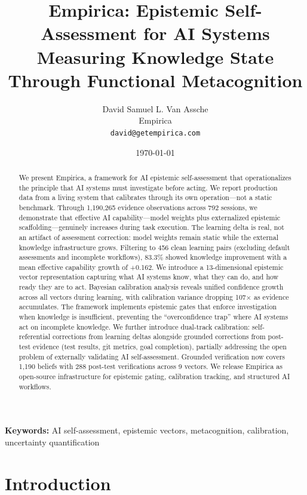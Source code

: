 \documentclass[11pt,a4paper]{article}
\title{Empirica: Epistemic Self-Assessment for AI Systems\\
\large Measuring Knowledge State Through Functional Metacognition}
\author{
    David Samuel L. Van Assche\\
    Empirica\\
    \texttt{david@getempirica.com}
}
\date{\today}
\begin{document}
\maketitle

\begin{abstract}
We present Empirica, a framework for AI epistemic self-assessment that operationalizes the principle that AI systems must investigate before acting. We report production data from a living system that calibrates through its own operation---not a static benchmark. Through 1,190,265 evidence observations across 792 sessions, we demonstrate that effective AI capability---model weights plus externalized epistemic scaffolding---genuinely increases during task execution. The learning delta is real, not an artifact of assessment correction: model weights remain static while the external knowledge infrastructure grows. Filtering to 456 clean learning pairs (excluding default assessments and incomplete workflows), 83.3\% showed knowledge improvement with a mean effective capability growth of +0.162. We introduce a 13-dimensional epistemic vector representation capturing what AI systems know, what they can do, and how ready they are to act. Bayesian calibration analysis reveals unified confidence growth across all vectors during learning, with calibration variance dropping 107$\times$ as evidence accumulates. The framework implements epistemic gates that enforce investigation when knowledge is insufficient, preventing the ``overconfidence trap'' where AI systems act on incomplete knowledge. We further introduce dual-track calibration: self-referential corrections from learning deltas alongside grounded corrections from post-test evidence (test results, git metrics, goal completion), partially addressing the open problem of externally validating AI self-assessment. Grounded verification now covers 1,190 beliefs with 288 post-test verifications across 9 vectors. We release Empirica as open-source infrastructure for epistemic gating, calibration tracking, and structured AI workflows.
\end{abstract}

\textbf{Keywords:} AI self-assessment, epistemic vectors, metacognition, calibration, uncertainty quantification

\section{Introduction}
\label{sec:introduction}

\end{document}
